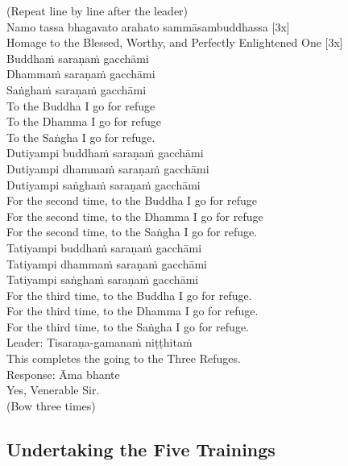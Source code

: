(Repeat line by line after the leader)\\
Namo tassa bhagavato arahato sammāsambuddhassa \hfill{[3x]}\\
Homage to the Blessed, Worthy, and Perfectly Enlightened One \hfill{[3x]}\\
Buddhaṁ saraṇaṁ gacchāmi\\
Dhammaṁ saraṇaṁ gacchāmi\\
Saṅghaṁ saraṇaṁ gacchāmi\\
To the Buddha I go for refuge\\
To the Dhamma I go for refuge\\
To the Saṅgha I go for refuge.\\
Dutiyampi buddhaṁ saraṇaṁ gacchāmi\\
Dutiyampi dhammaṁ saraṇaṁ gacchāmi\\
Dutiyampi saṅghaṁ saraṇaṁ gacchāmi\\
For the second time, to the Buddha I go for refuge\\
For the second time, to the Dhamma I go for refuge\\
For the second time, to the Saṅgha I go for refuge.\\
Tatiyampi buddhaṁ saraṇaṁ gacchāmi\\
Tatiyampi dhammaṁ saraṇaṁ gacchāmi\\
Tatiyampi saṅghaṁ saraṇaṁ gacchāmi\\
For the third time, to the Buddha I go for refuge.\\
For the third time, to the Dhamma I go for refuge.\\
For the third time, to the Saṅgha I go for refuge.\\
Leader:         Tisaraṇa-gamanaṁ niṭṭhitaṁ\\
This completes the going to the Three Refuges.\\
Response:     Āma bhante\\
Yes, Venerable Sir.\\


(Bow three times)\\

\subsection{Undertaking the Five Trainings}


